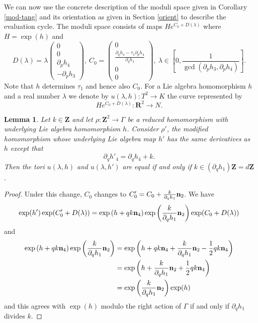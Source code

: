 \documentclass[11pt]{amsart}
\newcommand{\RR}{\mathbf{R}}
\newcommand{\ZZ}{\mathbf{Z}}
\numberwithin{equation}{section}
\newtheorem{lma}[equation]{Lemma}
\theoremstyle{definition}
\theoremstyle{remark}
\begin{document}
We can now use the concrete description of the moduli space given in Corollary \ref{mod-tang} and its orientation as given in Section \ref{orient} to describe the evaluation cycle. The moduli space consists of maps $He^{C_0+D(\lambda)}$ where $H=\exp(h)$ and
\[D(\lambda)=\lambda\left(\begin{array}{c}
0\\
0\\
\partial_ph_4\\
-\partial_ph_3
\end{array}\right),
\ C_0=\left(\begin{array}{c}
0\\
\frac{\partial_qh_4-\tau_1\partial_ph_4}{\partial_qh_1}\\
0\\
0
\end{array}\right),\ \lambda\in\left[0,\frac{1}{\gcd\left(\partial_ph_3,\partial_ph_4\right)}\right].\]
Note that $h$ determines $\tau_1$ and hence also $C_0$. For a Lie algebra homomorphism $h$ and a real number $\lambda$ we denote by $u(\lambda,h)\colon T^2\to K$ the curve represented by
\[He^{C_0+D(\lambda)}\colon \RR^2\to N.\]
\begin{lma}
Let $k\in\ZZ$ and let $\rho\colon\ZZ^2\to\Gamma$ be a reduced homomorphism with underlying Lie algebra homomorphism $h$. Consider $\rho'$, the modified homomorphism whose underlying Lie algebra map $h'$ has the same derivatives as $h$ except that
\[\partial_qh'_4=\partial_qh_4+k.\]
Then the tori $u(\lambda,h)$ and $u(\lambda,h')$ are equal if and only if $k\in(\partial_qh_1)\ZZ=d\ZZ$.
\end{lma}
\begin{proof}
Under this change, $C_0$ changes to $C'_0=C_0+\frac{k}{\partial_qh_1}{\bf n}_2$. We have
\[\exp(h')\exp(C'_0+D(\lambda))=\exp\left(h+qk{\bf n}_4\right)\exp\left(\frac{k}{\partial_qh_1}{\bf n}_2\right)\exp(C_0+D(\lambda))\]
and
\begin{align*}
\exp\left(h+qk{\bf n}_4\right)\exp\left(\frac{k}{\partial_qh_1}{\bf n}_2\right)&=\exp\left(h+qk{\bf n}_4+\frac{k}{\partial_qh_1}{\bf n}_2-\frac{1}{2}qk{\bf n}_4\right)\\
&=\exp\left(h+\frac{k}{\partial_qh_1}{\bf n}_2+\frac{1}{2}qk{\bf n}_4\right)\\
&=\exp\left(\frac{k}{\partial_qh_1}{\bf n}_2\right)\exp(h)
\end{align*}
and this agrees with $\exp(h)$ modulo the right action of $\Gamma$ if and only if $\partial_qh_1$ divides $k$.
\end{proof}
\end{document}
